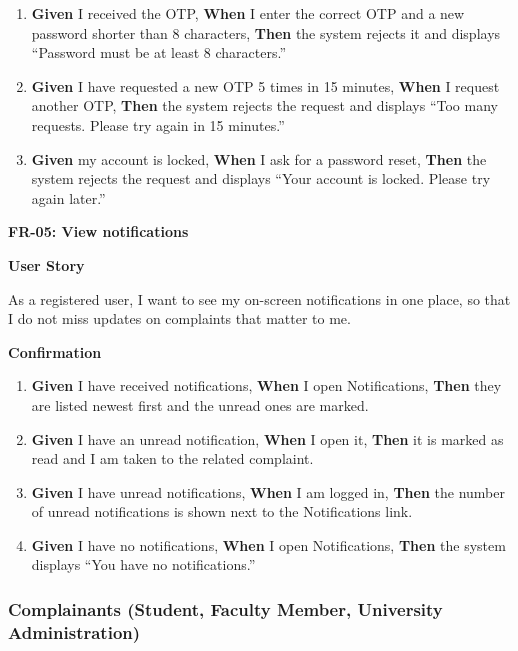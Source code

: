 {\begin{enumerate}
  \item \textbf{Given} I received the OTP, \textbf{When} I enter the correct OTP and a new password shorter than 8 characters, \textbf{Then} the system rejects it and displays ``Password must be at least 8 characters.''
  \item \textbf{Given} I have requested a new OTP 5 times in 15 minutes, \textbf{When} I request another OTP, \textbf{Then} the system rejects the request and displays ``Too many requests. Please try again in 15 minutes.''
  \item \textbf{Given} my account is locked, \textbf{When} I ask for a password reset, \textbf{Then} the system rejects the request and displays ``Your account is locked. Please try again later.''
\end{enumerate}}
\medskip
 
\noindent\textbf{FR-05: View notifications}\par\nopagebreak[4]\smallskip
\noindent\textbf{User Story}\par\nopagebreak[4]
\noindent As a registered user, I want to see my on-screen notifications in one place, so that I do not miss updates on complaints that matter to me.\par\smallskip
{\makeatletter
{}
\makeatother
\noindent\textbf{Confirmation}\par\nopagebreak[4]\vspace{-6pt}\nopagebreak[4]
\begin{enumerate}\setlength{\itemsep}{2pt}\setlength{\parsep}{0pt}\setlength{\topsep}{2pt}\setlength{\partopsep}{0pt}
  \item \textbf{Given} I have received notifications, \textbf{When} I open Notifications, \textbf{Then} they are listed newest first and the unread ones are marked.
  \item \textbf{Given} I have an unread notification, \textbf{When} I open it, \textbf{Then} it is marked as read and I am taken to the related complaint.
  \item \textbf{Given} I have unread notifications, \textbf{When} I am logged in, \textbf{Then} the number of unread notifications is shown next to the Notifications link.
  \item \textbf{Given} I have no notifications, \textbf{When} I open Notifications, \textbf{Then} the system displays ``You have no notifications.''
\end{enumerate}}
\medskip
 
\subsubsection*{Complainants (Student, Faculty Member, University Administration)}

